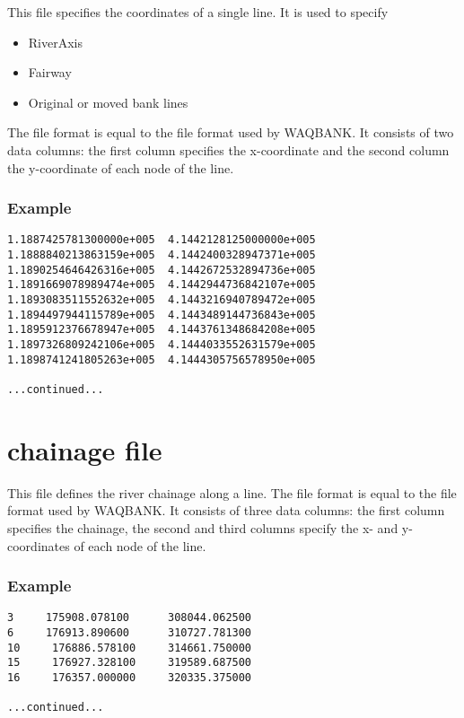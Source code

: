 This file specifies the coordinates of a single line.
It is used to specify

\begin{itemize}
\item RiverAxis
\item Fairway
\item Original or moved bank lines
\end{itemize}

The file format is equal to the file format used by WAQBANK.
It consists of two data columns: the first column specifies the x-coordinate and the second column the y-coordinate of each node of the line.

\subsubsection*{Example}

\begin{Verbatim}
1.1887425781300000e+005  4.1442128125000000e+005
1.1888840213863159e+005  4.1442400328947371e+005
1.1890254646426316e+005  4.1442672532894736e+005
1.1891669078989474e+005  4.1442944736842107e+005
1.1893083511552632e+005  4.1443216940789472e+005
1.1894497944115789e+005  4.1443489144736843e+005
1.1895912376678947e+005  4.1443761348684208e+005
1.1897326809242106e+005  4.1444033552631579e+005
1.1898741241805263e+005  4.1444305756578950e+005

...continued...
\end{Verbatim}

\section{chainage file}

This file defines the river chainage along a line.
The file format is equal to the file format used by WAQBANK.
It consists of three data columns: the first column specifies the chainage, the second and third columns specify the x- and y-coordinates of each node of the line.

\subsubsection*{Example}

\begin{Verbatim}
3     175908.078100      308044.062500
6     176913.890600      310727.781300
10     176886.578100     314661.750000
15     176927.328100     319589.687500
16     176357.000000     320335.375000 

...continued...
\end{Verbatim}

